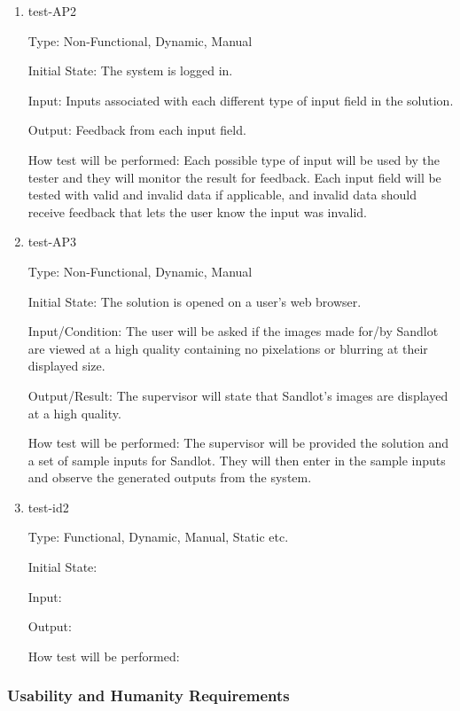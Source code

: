 \documentclass[12pt, titlepage]{article}
\begin{document}
\begin{enumerate}

  \item{test-AP2\\}

  Type: Non-Functional, Dynamic, Manual

  Initial State: The system is logged in.

  Input: Inputs associated with each different type of input field in the
  solution.

  Output: Feedback from each input field.

  How test will be performed: Each possible type of input will be used by the
  tester and they will monitor the result for feedback. Each input field will
  be tested with valid and invalid data if applicable, and invalid data should
  receive feedback that lets the user know the input was invalid.

\item{test-AP3\\}

Type: Non-Functional, Dynamic, Manual
					
Initial State: The solution is opened on a user's web browser.
					
Input/Condition: The user will be asked if the images made for/by Sandlot are viewed at
a high quality containing no pixelations or blurring at their displayed size.
					
Output/Result: The supervisor will state that Sandlot's images are displayed at a high
quality.
					
How test will be performed: The supervisor will be provided the solution and a set of
sample inputs for Sandlot. They will then enter in the sample inputs and observe the
generated outputs from the system.

					
\item{test-id2\\}

Type: Functional, Dynamic, Manual, Static etc.
					
Initial State: 
					
Input: 
					
Output: 
					
How test will be performed: 

\end{enumerate}

\subsubsection{Usability and Humanity Requirements}
\end{document}
